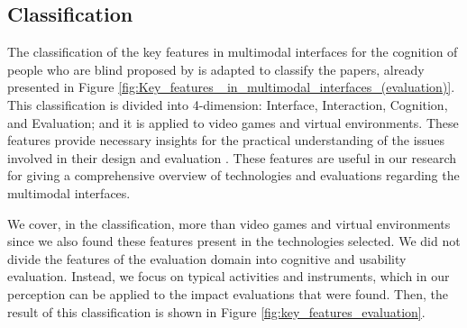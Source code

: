  	\begin{figure}[h] 
   	    \captionsetup{width=12cm}%
	\end{figure}

\subsection{Classification}
\label{subsec:results-classification}

The classification of the key features in multimodal interfaces for the cognition of people who are blind proposed by  is adapted to classify the papers, already presented in Figure \ref{fig:Key_features _in_multimodal_interfaces_(evaluation)}. This classification is divided into 4-dimension: Interface, Interaction, Cognition, and Evaluation; and it is applied to video games and virtual environments. These features provide necessary insights for the practical understanding of the issues involved in their design and evaluation . These features are useful in our research for giving a comprehensive overview of technologies and evaluations regarding the multimodal interfaces.

We cover, in the classification, more than video games and virtual environments since we also found these features present in the technologies selected. We did not divide the features of the evaluation domain into cognitive and usability evaluation. Instead, we focus on typical activities and instruments, which in our perception can be applied to the impact evaluations that were found. Then, the result of this classification is shown in Figure \ref{fig:key_features_evaluation}.

